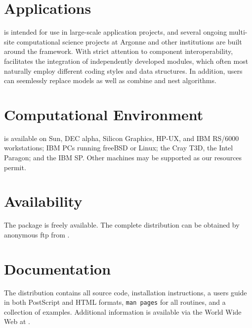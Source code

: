 \section*{Applications}
 is intended for use in large-scale application projects, and
several ongoing multi-site computational science projects at Argonne and
other institutions are built around the  framework.
With strict attention to component interoperability, 
facilitates the integration of independently developed modules, which
often most naturally employ different coding styles and data
structures.  In addition, users can seemlessly replace models as well
as combine and nest algorithms.

\section*{Computational Environment}
 is available on Sun, DEC alpha, Silicon Graphics, HP-UX, and IBM
RS/6000 workstations; IBM PCs running freeBSD or Linux; the Cray T3D,
the Intel Paragon; and the IBM SP. Other machines may be supported as our
resources permit.

\section*{Availability}

The  package is freely available.
The complete distribution can be obtained by anonymous ftp from 
.

\section*{Documentation}

The  distribution contains all source code, 
installation instructions,
a users guide in both PostScript and HTML formats, 
{\tt man pages} for all routines,
and a collection of examples.
Additional information is available via the World Wide Web at
.
\makeinfo

